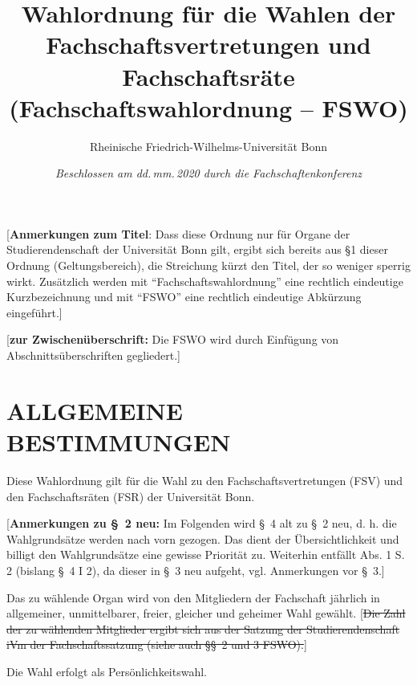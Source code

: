 \documentclass[%
draft,%
multilinesections%
]{fswo}
\newcommand\oldT[1]  {{\color{Gray}[\st{#1}]}}
\newcommand\bemFr[1] {{\color{Red}[#1]}}
\newcommand\oldT[1]{}%
\newcommand\bemFr[1]{}%
\begin{document}
\title{Wahlordnung für die Wahlen der Fachschaftsvertretungen und Fachschaftsräte\\
(Fachschaftswahlordnung -- FSWO)}
\subtitle{Rheinische Friedrich-Wilhelms-Universität Bonn}
\author{}
\date{{\itshape\normalsize%
  Beschlossen am dd.\,mm.\,2020 durch die Fachschaftenkonferenz}}
\publishers{\itshape\normalsize%
  sowie am dd.\,mm.\,2020 durch das Studierendenparlament.}

\maketitle

\bemFr{\textbf{Anmerkungen zum Titel}: Dass diese Ordnung nur für Organe der Studierendenschaft der Universität Bonn gilt, ergibt sich bereits aus \S 1 dieser Ordnung (Geltungsbereich), die Streichung kürzt den Titel, der so weniger sperrig wirkt. Zusätzlich werden mit \enquote{Fachschaftswahlordnung} eine rechtlich eindeutige Kurzbezeichnung und mit \enquote{FSWO} eine rechtlich eindeutige Abkürzung eingeführt.}

\begingroup
\endgroup


\bemFr{\textbf{zur Zwischenüberschrift:} Die FSWO wird durch Einfügung von Abschnittsüberschriften gegliedert.}
\section{ALLGEMEINE BESTIMMUNGEN}

\begin{contract}
Diese Wahlordnung gilt für die Wahl zu den Fachschaftsvertretungen (FSV) und den Fachschaftsräten (FSR) der Universität Bonn.
\end{contract}

\bemFr{\textbf{Anmerkungen zu \S~2 neu:}
Im Folgenden wird \S~4 alt zu \S~2 neu, d. h. die Wahlgrundsätze werden nach vorn gezogen.
Das dient der Übersichtlichkeit und billigt den Wahlgrundsätze eine gewisse Priorität zu.
Weiterhin entfällt Abs. 1 S. 2 (bislang \S~4 I 2), da dieser in \S~3 neu aufgeht, vgl. Anmerkungen vor \S~3.}

\begin{contract}
Das zu wählende Organ wird von den Mitgliedern der Fachschaft jährlich in allgemeiner, unmittelbarer, freier, gleicher und geheimer Wahl gewählt. \oldT{Die Zahl der zu wählenden Mitglieder ergibt sich aus der Satzung der Studierendenschaft iVm der Fachschaftssatzung (siehe auch \S\S~2 und 3 FSWO).}

Die Wahl erfolgt als Persönlichkeitswahl.
\end{contract}
\end{document}
